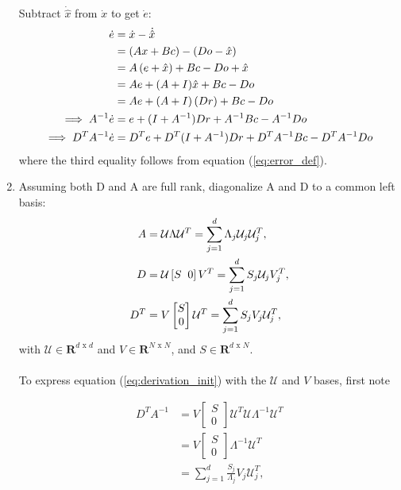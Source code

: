 \begin{enumerate}
    Subtract $\dot{\hat{x}}$ from $\dot{x}$ to get $\dot{e}$:
    \begin{align}
    \label{eq:derivation_init}
        \dot{e} &= \dot{x}-\dot{\hat{x}} \notag \\
        &= \left( Ax + Bc \right) - \left( Do - \hat{x} \right) \notag \\
        &= A\left(  e + \hat{x} \right) + Bc - Do + \hat{x} \notag \\
        &= A e + (A + I)\hat{x} + Bc - Do \notag \\
        &=  A e + (A + I) \left(Dr\right) + Bc - Do \notag \\
        \implies A^{-1}\dot{e} &= e + (I + A^{-1}) Dr + A^{-1} Bc - A^{-1}Do \notag \\ 
        \implies D^{T} A^{-1} \dot{e} &= D^T e +D^T (I + A^{-1}) Dr + D^T A^{-1}Bc - D^T A^{-1} D o 
    \end{align}
where the third equality follows from equation (\ref{eq:error_def}).    

\item Assuming both D and A are full rank, diagonalize A and D to a common left basis:
\begin{align*}
    A &= \mathcal{U} \Lambda \mathcal{U}^T = \sum_{j=1}^d \Lambda_j \mathcal{U}_j \mathcal{U}_j^T,\\
    D &= \mathcal{U} \left[S \hspace{2mm} 0 \right]  V^T = \sum_{j=1}^d S_j \mathcal{U}_j  V_j^T,\\
    D^T &= V \begin{bmatrix} S \\ 0\end{bmatrix} \mathcal{U}^T = \sum_{j=1}^d S_j V_j  \mathcal{U}_j^T,
\end{align*}
with $\mathcal{U} \in \mathbf{R}^{d \text{ x } d}$ and $V \in \mathbf{R}^{N \text{ x } N}$, and $S \in \mathbf{R}^{d \text{ x } N }$. \\
\\
To express equation (\ref{eq:derivation_init}) with the $\mathcal{U}$ and $V$ bases, first note

\begin{align*}
     D^{T} A^{-1}  &= V \begin{bmatrix} S \\ 0\end{bmatrix} \mathcal{U}^T  \mathcal{U} \Lambda^{-1} \mathcal{U}^T \\
     &= V \begin{bmatrix} S \\ 0\end{bmatrix} \Lambda^{-1} \mathcal{U}^T \\
     &= \sum_{j = 1}^{d} \frac{S_j}{ \Lambda_j} V_j \mathcal{U}_j^T,
\end{align*}\\


\end{enumerate}
